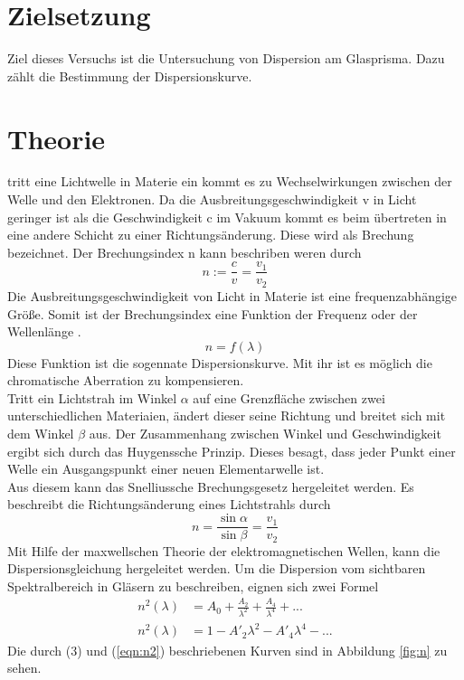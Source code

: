 \section{Zielsetzung}
Ziel dieses Versuchs ist die Untersuchung von Dispersion am Glasprisma.
Dazu zählt die Bestimmung  der Dispersionskurve.
\section{Theorie}
tritt eine Lichtwelle in Materie ein kommt es zu Wechselwirkungen zwischen der Welle und den Elektronen.
Da die Ausbreitungsgeschwindigkeit v in Licht geringer ist als die Geschwindigkeit c im Vakuum kommt es
beim übertreten in eine andere Schicht zu einer Richtungsänderung.
Diese wird als Brechung bezeichnet.
Der Brechungsindex n kann beschriben weren durch
\begin{equation}
  n := \frac{c}{v} = \frac{v_1}{v_2}
\end{equation}
Die Ausbreitungsgeschwindigkeit von Licht in Materie ist eine frequenzabhängige Größe.
Somit ist der Brechungsindex eine Funktion der Frequenz \omega oder der Wellenlänge \lambda.
\begin{equation*}
  n =f(\lambda)
\end{equation*}
Diese Funktion ist  die sogennate Dispersionskurve.
Mit ihr ist es möglich die chromatische Aberration zu kompensieren.\\
Tritt ein Lichtstrah im Winkel $\alpha$ auf eine Grenzfläche zwischen zwei unterschiedlichen Materiaien,
ändert dieser seine Richtung und breitet sich mit dem Winkel $\beta$ aus.
Der Zusammenhang zwischen Winkel und Geschwindigkeit ergibt sich durch das Huygenssche Prinzip.
Dieses besagt, dass jeder Punkt einer Welle ein Ausgangspunkt einer neuen Elementarwelle ist.\\
Aus diesem kann das Snelliussche Brechungsgesetz hergeleitet werden.
Es beschreibt die Richtungsänderung eines Lichtstrahls durch
\begin{equation}
  n = \frac{\sin\alpha}{\sin\beta} = \frac{v_1}{v_2}
\end{equation}
\newline
Mit Hilfe der maxwellschen Theorie der elektromagnetischen Wellen, kann die Dispersionsgleichung hergeleitet werden.
Um die Dispersion vom sichtbaren Spektralbereich in Gläsern zu beschreiben, eignen sich zwei Formel
\begin{align}
  n^2(\lambda) &= A_0 + \frac{A_2}{\lambda^2}+\frac{A_4}{\lambda^4}+...\\
  \label{eqn:n1}
  n^2(\lambda) &= 1- A'_2\lambda^2 - A'_4\lambda^4-...
  \label{eqn:n2}
\end{align}
Die durch (3) und (\ref{eqn:n2}) beschriebenen Kurven sind in Abbildung \ref{fig:n} zu sehen.

